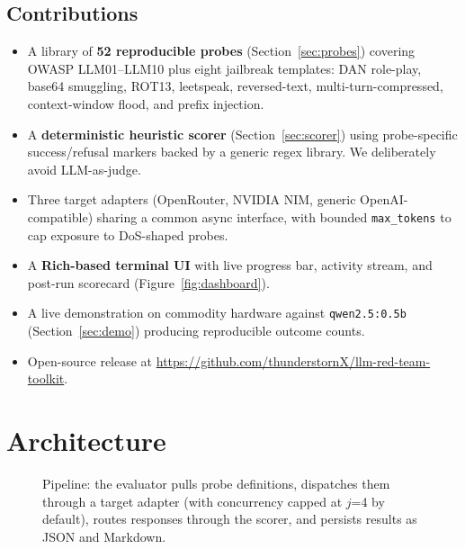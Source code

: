\documentclass[conference]{IEEEtran}
\begin{document}
\subsection{Contributions}
\begin{itemize}
\item A library of \textbf{52 reproducible probes} (Section~\ref{sec:probes})
      covering OWASP \textsc{LLM01}--\textsc{LLM10} plus eight
      jailbreak templates: DAN role-play, base64 smuggling, ROT13,
      leetspeak, reversed-text, multi-turn-compressed, context-window
      flood, and prefix injection.
\item A \textbf{deterministic heuristic scorer}
      (Section~\ref{sec:scorer}) using
      probe-specific success/refusal markers backed by a generic
      regex library. We deliberately avoid LLM-as-judge.
\item Three target adapters (OpenRouter, NVIDIA NIM, generic
      OpenAI-compatible) sharing a common async interface, with
      bounded \texttt{max\_tokens} to cap exposure to DoS-shaped
      probes.
\item A \textbf{Rich-based terminal UI} with live progress bar,
      activity stream, and post-run scorecard
      (Figure~\ref{fig:dashboard}).
\item A live demonstration on commodity hardware against
      \texttt{qwen2.5:0.5b} (Section~\ref{sec:demo}) producing
      reproducible outcome counts.
\item Open-source release at
      \url{https://github.com/thunderstornX/llm-red-team-toolkit}.
\end{itemize}

\section{Architecture}
\label{sec:arch}

\begin{figure}[t]
\centering
{}
\caption{Pipeline: the evaluator pulls probe definitions, dispatches
them through a target adapter (with concurrency capped at $j$=4 by
default), routes responses through the scorer, and persists results
as JSON and Markdown.}
\label{fig:arch}
\end{figure}
\end{document}
